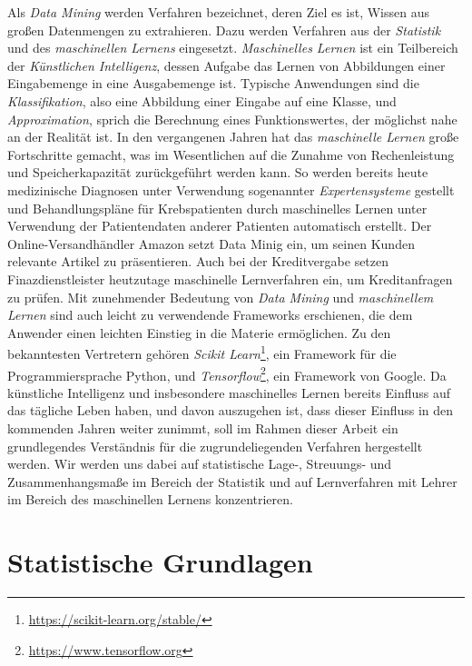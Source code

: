 \documentclass[fontsize=11pt]{scrartcl}
\begin{document}
            Als \emph{Data Mining} werden Verfahren bezeichnet, deren Ziel es ist, Wissen aus großen Datenmengen zu extrahieren. Dazu werden Verfahren aus der \emph{Statistik} und des \emph{maschinellen Lernens} eingesetzt.\cite{ertel2016}
            \emph{Maschinelles Lernen} ist ein Teilbereich der \emph{Künstlichen Intelligenz}, dessen Aufgabe das Lernen von Abbildungen einer Eingabemenge in eine Ausgabemenge ist. Typische Anwendungen sind die \emph{Klassifikation}, also eine Abbildung einer Eingabe auf eine Klasse, und \emph{Approximation}, sprich die Berechnung eines Funktionswertes, der möglichst nahe an der Realität ist\cite{ertel2016,mlfor}.
            In den vergangenen Jahren hat das \emph{maschinelle Lernen} große Fortschritte gemacht, was im Wesentlichen auf die Zunahme von Rechenleistung und Speicherkapazität zurückgeführt werden kann.\cite{mlfor}
            So werden bereits heute medizinische Diagnosen unter Verwendung sogenannter \emph{Expertensysteme} gestellt\cite{ertel2016} und Behandlungspläne für Krebspatienten durch maschinelles Lernen unter Verwendung der Patientendaten anderer Patienten automatisch erstellt.\cite{mlfor}
            Der Online-Versandhändler Amazon setzt Data Minig ein, um seinen Kunden relevante Artikel zu präsentieren.\cite{ertel2016}
            Auch bei der Kreditvergabe setzen Finazdienstleister heutzutage maschinelle Lernverfahren ein, um Kreditanfragen zu prüfen.\cite{mlfor}
            Mit zunehmender Bedeutung von \emph{Data Mining} und \emph{maschinellem Lernen} sind auch leicht zu verwendende Frameworks erschienen, die dem Anwender einen leichten Einstieg in die Materie ermöglichen. Zu den bekanntesten Vertretern gehören \emph{Scikit Learn}\footnote{\url{https://scikit-learn.org/stable/}}, ein Framework für die Programmiersprache Python, und \emph{Tensorflow}\footnote{\url{https://www.tensorflow.org}}, ein Framework von Google.
            Da künstliche Intelligenz und insbesondere maschinelles Lernen bereits Einfluss auf das tägliche Leben haben, und davon auszugehen ist, dass dieser Einfluss in den kommenden Jahren weiter zunimmt, soll im Rahmen dieser Arbeit ein grundlegendes Verständnis für die zugrundeliegenden Verfahren hergestellt werden. Wir werden uns dabei auf statistische Lage-, Streuungs- und Zusammenhangsmaße im Bereich der Statistik und auf Lernverfahren mit Lehrer im Bereich des maschinellen Lernens konzentrieren.

        \section{Statistische Grundlagen}
            
\end{document}
